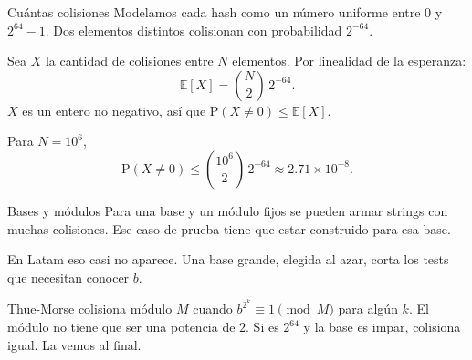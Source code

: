 \begin{frame}{Cuántas colisiones}
  Modelamos cada hash como un número uniforme entre \(0\) y \(2^{64}-1\).
  Dos elementos distintos colisionan con probabilidad \(2^{-64}\).

  \medskip
  Sea \(X\) la cantidad de colisiones entre \(N\) elementos.
  Por linealidad de la esperanza:
  \[
    \mathbb{E}[X] = \binom{N}{2}\, 2^{-64}.
  \]
  \(X\) es un entero no negativo, así que \(\mathrm{P}(X \neq 0) \le \mathbb{E}[X]\).

  \medskip
  Para \(N = 10^{6}\),
  \[
    \mathrm{P}(X \neq 0)
      \le \binom{10^{6}}{2}\, 2^{-64}
      \approx 2.71 \times 10^{-8}.
  \]
\end{frame}

\begin{frame}{Bases y módulos}
  Para una base y un módulo fijos se pueden armar strings con muchas colisiones.
  Ese caso de prueba tiene que estar construido para esa base.

  \medskip
  En Latam eso casi no aparece.
  Una base grande, elegida al azar, corta los tests que necesitan conocer \(b\).

  \medskip
  Thue-Morse colisiona módulo \(M\) cuando \(b^{2^{k}} \equiv 1 \pmod{M}\) para algún \(k\).
  El módulo no tiene que ser una potencia de \(2\).
  Si es \(2^{64}\) y la base es impar, colisiona igual.
  La vemos al final.
\end{frame}
